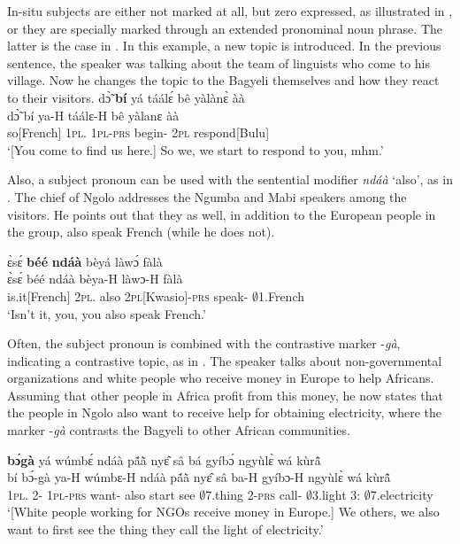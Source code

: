 In-situ subjects are either not marked at all, but zero expressed, as illustrated in , or they are specially marked through an extended pronominal noun phrase. The latter is the case in .
In this example, a new topic is introduced. In the previous sentence, the speaker was talking about the team of linguists who come to his village. Now he changes the topic to the Bagyeli themselves and how they react to their visitors.
\ea \label{Emp1} 
 \glll  dɔ̃̀ {\bfseries bí} yá táálɛ́ bê yàlànɛ̀ àà\\
       dɔ̃̀ bí ya-H táálɛ-H bê yàlanɛ àà\\
       so[French] 1\textsc{pl}.{\SBJ}  1\textsc{pl}-\textsc{prs} begin-{\R} 2\textsc{pl} respond[Bulu] {\EXCL}\\
    \trans `[You come to find us here.] So we, we start to respond to you, mhm.'
\z

Also, a subject pronoun can be used with the sentential modifier {\itshape ndáà} `also', as in . The chief of Ngolo addresses the Ngumba and Mabi speakers among the visitors. He points out that they as well, in addition to the European people in the group, also speak French (while he does not).

\ea \label{Emp3}
  \glll  ɛ̀sɛ́ {\bfseries béé} {\bfseries ndáà} bèyá làwɔ́ fàlà\\
       ɛ̀sɛ́ béé ndáà bèya-H làwɔ-H fàlà\\
        is.it[French] 2\textsc{pl}.{\SBJ} also 2\textsc{pl}[Kwasio]-\textsc{prs} speak-{\R} $\emptyset$1.French\\
    \trans `Isn't it, you, you also speak French.'
\z

Often, the subject pronoun is combined with the contrastive marker -{\itshape gà}, indicating a contrastive topic, as in . The speaker talks about non-governmental organizations and white people who receive money in Europe to help Africans. Assuming that other people in Africa profit from this money, he now states that the people in Ngolo also want to receive help for obtaining electricity, where the marker -{\itshape gà} contrasts the Bagyeli to other African communities.

\ea \label{Emp2} 
   {\bfseries bɔ́gà} yá wúmbɛ́ ndáà pã́ã̀ nyɛ̂ sâ bá gyíbɔ́ ngyùlɛ̀ wá kùrã̂\\
         bí bɔ́-gà ya-H wúmbɛ-H ndáà pã́ã̀ nyɛ̂ sâ ba-H gyíbɔ-H ngyùlɛ̀ wá kùrã̂\\
          1\textsc{pl}.{\SBJ} 2-{\CONTR} 1\textsc{pl}-\textsc{prs} want-{\R} also start see $\emptyset$7.thing 2-\textsc{prs} call-{\R} $\emptyset$3.light 3:{\ATT} $\emptyset$7.electricity\\
    \trans `[White people working for NGOs receive money in Europe.] We others, we also want to first see the thing they call the light of electricity.'
\z

